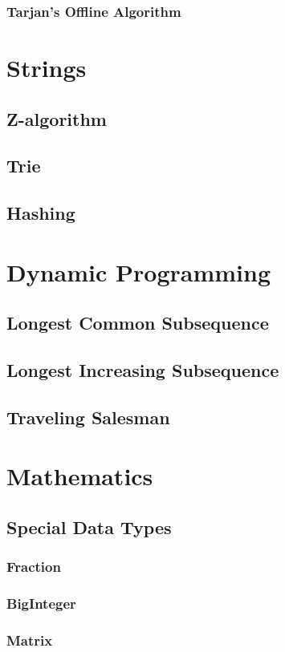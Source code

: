 \documentclass[8pt,a4paper,landscape,oneside]{amsart}
\begin{document}
\begin{multicols*}{3}
		\subsubsection{Tarjan's Offline Algorithm}
\section{Strings}
	\subsection{Z-algorithm}
	\subsection{Trie}
	\subsection{Hashing}
\section{Dynamic Programming}
	\subsection{Longest Common Subsequence}
	\subsection{Longest Increasing Subsequence}
	\subsection{Traveling Salesman}
\section{Mathematics}
	\subsection{Special Data Types}
		\subsubsection{Fraction}
		\subsubsection{BigInteger}
		\subsubsection{Matrix}

\end{multicols*}
\end{document}

